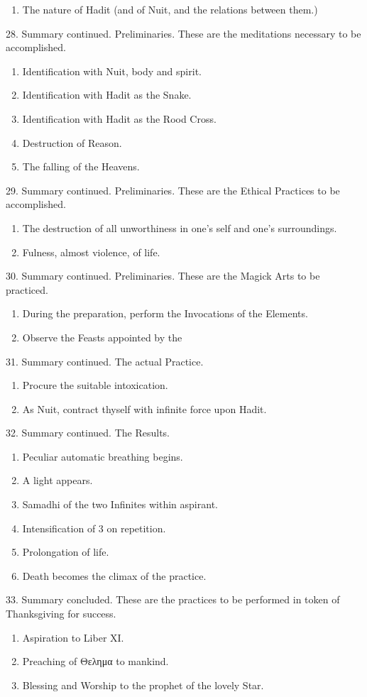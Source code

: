 \begin{enumerate}[leftmargin=4\parindent]
\item The nature of Hadit (and of Nuit, and the relations between them.)
\end{enumerate}

28. Summary continued. Preliminaries. These are the meditations necessary to be accomplished.

\begin{enumerate}[leftmargin=4\parindent]

\item Identification with Nuit, body and spirit.
\item Identification with Hadit as the Snake.
\item Identification with Hadit as the Rood Cross.
\item Destruction of Reason.
\item The falling of the Heavens.
\end{enumerate}

29. Summary continued. Preliminaries. These are the Ethical Practices to be accomplished.
\begin{enumerate}[leftmargin=4\parindent]
\item The destruction of all unworthiness in one's self and one's surroundings.
\item Fulness, almost violence, of life.
\end{enumerate}

30. Summary continued. Preliminaries. These are the Magick Arts to be practiced.
\begin{enumerate}[leftmargin=4\parindent]
\item During the preparation, perform the Invocations of the Elements.
\item Observe the Feasts appointed by the \Argentium{}
\end{enumerate}

31. Summary continued. The actual Practice.

\begin{enumerate}[leftmargin=4\parindent]
\item Procure the suitable intoxication.
\item As Nuit, contract thyself with infinite force upon Hadit.
\end{enumerate}

32. Summary continued. The Results.
\begin{enumerate}[leftmargin=4\parindent]
\item Peculiar automatic breathing begins.
\item A light appears.
\item Samadhi of the two Infinites within aspirant.
\item Intensification of 3 on repetition.
\item Prolongation of life.
\item Death becomes the climax of the practice.
\end{enumerate}

33. Summary concluded. These are the practices to be performed in token of Thanksgiving for success.
\begin{enumerate}[leftmargin=4\parindent]
\item Aspiration to Liber XI.
\item Preaching of Θελημα to mankind.
\item Blessing and Worship to the prophet of the lovely Star.
\end{enumerate}

